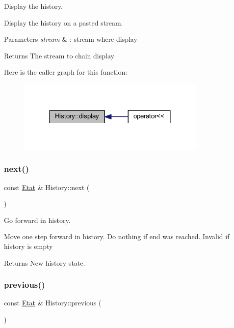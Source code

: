 Display the history. 

Display the history on a pasted stream.


\begin{DoxyParams}{Parameters}
{\em stream} & \+: stream where display\\
\hline
\end{DoxyParams}
\begin{DoxyReturn}{Returns}
The stream to chain display 
\end{DoxyReturn}
Here is the caller graph for this function\+:
\nopagebreak
\begin{figure}[H]
\begin{center}
\leavevmode
\includegraphics[width=264pt]{class_history_a5c1724d84912d1571d2475b2fb703081_icgraph}
\end{center}
\end{figure}
\mbox{\label{class_history_ab0535cf179200bf8a79a854aac783aa1}} 
\subsubsection{\texorpdfstring{next()}{next()}}
{\footnotesize\ttfamily const \hyperlink{class_etat}{Etat} \& History\+::next (\begin{DoxyParamCaption}{ }\end{DoxyParamCaption})}



Go forward in history. 

Move one step forward in history. Do nothing if end was reached. Invalid if history is empty

\begin{DoxyReturn}{Returns}
New history state. 
\end{DoxyReturn}
\mbox{\label{class_history_a8a0bb0748169bc93404987108a14f4bc}} 
\subsubsection{\texorpdfstring{previous()}{previous()}}
{\footnotesize\ttfamily const \hyperlink{class_etat}{Etat} \& History\+::previous (\begin{DoxyParamCaption}{ }\end{DoxyParamCaption})}



